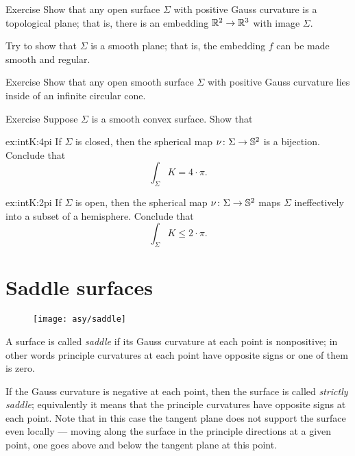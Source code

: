 \begin{thm}{Exercise}\label{ex:open+convex=plane}
Show that any open surface $\Sigma$ with positive Gauss curvature is a topological plane;
that is, there is an embedding $\mathbb{R}^2\to\mathbb{R}^3$ with image $\Sigma$.

Try to show that $\Sigma$ is a smooth plane; that is, the embedding $f$ can be made smooth and regular.
\end{thm}

\begin{thm}{Exercise}\label{ex:circular-cone}
Show that any open smooth surface $\Sigma$ with positive Gauss curvature
lies inside of an infinite circular cone. 
\end{thm} 

\begin{thm}{Exercise}\label{ex:intK}
Suppose $\Sigma$ is a smooth convex surface.
Show that 

\begin{subthm}{ex:intK:4pi}
If $\Sigma$ is closed, then the spherical map $\nu\colon\Sigma\to \mathbb{S}^2$ is a bijection. Conclude that 
\[\int_\Sigma K=4\cdot\pi.\]
\end{subthm}
\begin{subthm}{ex:intK:2pi}
If $\Sigma$ is open, then  the spherical map $\nu\colon\Sigma\to \mathbb{S}^2$
maps $\Sigma$ ineffectively into a subset of a hemisphere. Conclude that 
\[\int_\Sigma K\le 2\cdot\pi.\]
\end{subthm}
\end{thm}



\section*{Saddle surfaces}

\begin{wrapfigure}{r}{43 mm}
\vskip-8mm
\centering
\texttt{[image: asy/saddle]}
\vskip0mm
\end{wrapfigure}

A surface is called \emph{saddle} if its Gauss curvature at each point is nonpositive;
in other words principle curvatures at each point have opposite signs or one of them is zero.

If the Gauss curvature is negative at each point,
then the surface is called \emph{strictly saddle};
equivalently it means that the principle curvatures have opposite signs at each point.
Note that in this case the tangent plane does not support the surface even locally --- moving along the surface in the principle directions at a given point, one goes above and below the tangent plane at this point.  


